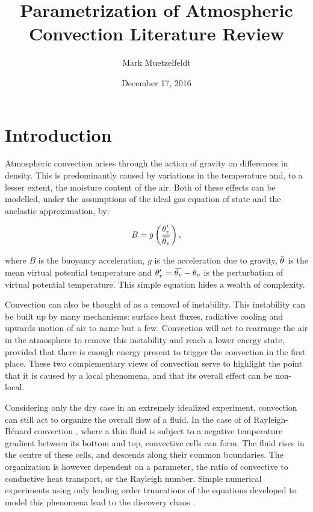 \documentclass[11pt,a4paper]{article}
\title{Parametrization of Atmospheric Convection Literature Review}
\date{December 17, 2016}
\author{Mark Muetzelfeldt}
\newcommand{\overbar}[1]{\mkern 1.5mu\overline{\mkern-1.5mu#1\mkern-1.5mu}\mkern 1.5mu}
\begin{document}
\maketitle

\section{Introduction}
\label{sec:introduction}

Atmospheric convection arises through the action of gravity on differences in density. This is predominantly caused by variations in the temperature and, to a lesser extent, the moisture content of the air. Both of these effects can be modelled, under the assumptions of the ideal gas equation of state and the anelastic approximation, by:

\begin{equation}
    B = g \left(\frac{\theta_v'}{\overbar{\theta_v}}\right),
\end{equation}

\noindent
where $B$ is the buoyancy acceleration, $g$ is the acceleration due to gravity, $\overbar{\theta}$ is the mean virtual potential temperature and $\theta_v' = \overbar{\theta_v} - \theta_v$ is the perturbation of virtual potential temperature. This simple equation hides a wealth of complexity. 

Convection can also be thought of as a removal of instability. This instability can be built up by many mechanisms: surface heat fluxes, radiative cooling and upwards motion of air to name but a few. Convection will act to rearrange the air in the atmosphere to remove this instability and reach a lower energy state, provided that there is enough energy present to trigger the convection in the first place. These two complementary views of convection serve to highlight the point that it is caused by a local phenomena, and that its overall effect can be non-local.

Considering only the dry case in an extremely idealized experiment, convection can still act to organize the overall flow of a fluid. In the case of of Rayleigh-B\'{e}nard convection \parencite{rayleigh1916lix}, where a thin fluid is subject to a negative temperature gradient between its bottom and top, convective cells can form. The fluid rises in the centre of these cells, and descends along their common boundaries. The organization is however dependent on a parameter, the ratio of convective to conductive heat transport, or the Rayleigh number. Simple numerical experiments using only leading order truncations of the equations developed to model this phenomena lead to the discovery chaos \parencite{lorenz1963deterministic}.
\end{document}
